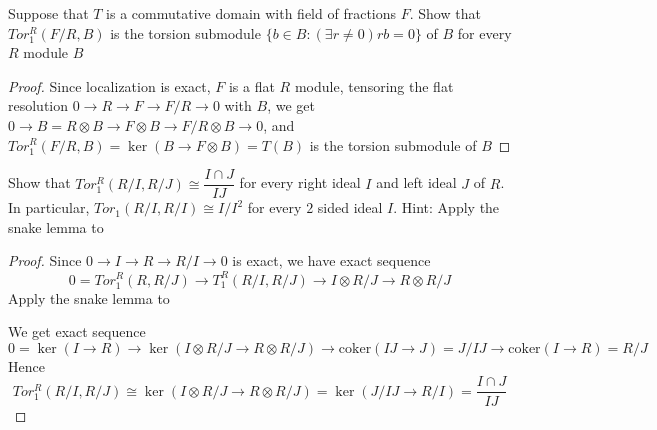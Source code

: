 \documentclass{article}
\newenvironment{exercise}[2][Exercise]{\begin{trivlist}
\item[\hskip \labelsep {\bfseries #1}\hskip \labelsep {\bfseries #2.}]}{\end{trivlist}}
\theoremstyle{definition}
\theoremstyle{remark}
\theoremstyle{definition}
\begin{document}
\begin{exercise}{\textbf{3.1.2}}
Suppose that $T$ is a commutative domain with field of fractions $F$. Show that $Tor_1^R(F/R,B)$ is the torsion submodule $\{b\in B:(\exists r\neq0)rb=0\}$ of $B$ for every $R$ module $B$
\end{exercise}

\begin{proof}
Since localization is exact, $F$ is a flat $R$ module, tensoring the flat resolution $0\to R\to F\to F/R\to0$ with $B$, we get $0\to B=R\otimes B\to F\otimes B\to F/R\otimes B\to0$, and $Tor^R_1(F/R,B)=\ker(B\to F\otimes B)=T(B)$ is the torsion submodule of $B$
\end{proof}

\begin{exercise}{\textbf{3.1.3}}
Show that $Tor_1^R(R/I,R/J)\cong\dfrac{I\cap J}{IJ}$ for every right ideal $I$ and left ideal $J$ of $R$. In particular, $Tor_1(R/I,R/I)\cong I/I^2$ for every $2$ sided ideal $I$. Hint: Apply the snake lemma to
\begin{center}
\end{center}
\end{exercise}

\begin{proof}
Since $0\to I\to R\to R/I\to0$ is exact, we have exact sequence
\[0=Tor^R_1(R,R/J)\to T^R_1(R/I,R/J)\to I\otimes R/J\to R\otimes R/J\]
Apply the snake lemma to
\begin{center}
\end{center}
We get exact sequence
\[0=\ker(I\to R)\to\ker(I\otimes R/J\to R\otimes R/J)\to\mathrm{coker}(IJ\to J)=J/IJ\to\mathrm{coker}(I\to R)=R/J\]
Hence
\[Tor^R_1(R/I,R/J)\cong\ker(I\otimes R/J\to R\otimes R/J)=\ker(J/IJ\to R/I)=\dfrac{I\cap J}{IJ}\]
\end{proof}
\end{document}

